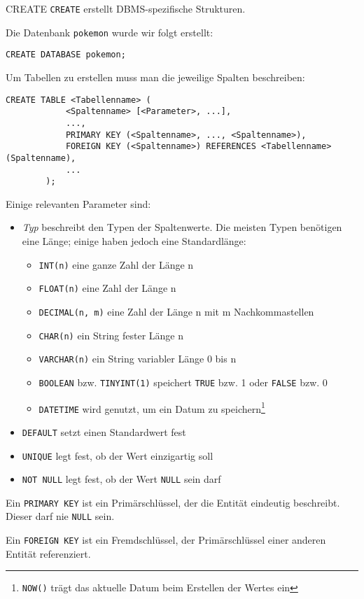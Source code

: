 \begin{sql}{CREATE}
    \texttt{CREATE} erstellt DBMS-spezifische Strukturen.

    Die Datenbank \texttt{pokemon} wurde wir folgt erstellt:

    \begin{lstlisting}[language=mysql]
        CREATE DATABASE pokemon;
    \end{lstlisting}

    Um Tabellen zu erstellen muss man die jeweilige Spalten beschreiben:

    \begin{lstlisting}[language=mysql]
        CREATE TABLE <Tabellenname> (
            <Spaltenname> [<Parameter>, ...],
            ...,
            PRIMARY KEY (<Spaltenname>, ..., <Spaltenname>),
            FOREIGN KEY (<Spaltenname>) REFERENCES <Tabellenname> (Spaltenname),
            ...
        );
    \end{lstlisting}

    Einige relevanten Parameter sind:

    \begin{itemize}
        \item \emph{Typ} beschreibt den Typen der Spaltenwerte.
            Die meisten Typen benötigen eine Länge; einige haben jedoch eine Standardlänge:
        
            \begin{itemize}
                \item \texttt{INT(n)} eine ganze Zahl der Länge n
                \item \texttt{FLOAT(n)} eine Zahl der Länge n
                \item \texttt{DECIMAL(n, m)} eine Zahl der Länge n mit m Nachkommastellen
                \item \texttt{CHAR(n)} ein String fester Länge n
                \item \texttt{VARCHAR(n)} ein String variabler Länge 0 bis n
                \item \texttt{BOOLEAN} bzw. \texttt{TINYINT(1)} speichert \texttt{TRUE} bzw. 1 oder \texttt{FALSE} bzw. 0
                \item \texttt{DATETIME} wird genutzt, um ein Datum zu speichern\footnote{\texttt{NOW()} trägt das aktuelle Datum beim Erstellen der Wertes ein}
            \end{itemize}
        \item \texttt{DEFAULT} setzt einen Standardwert fest
        \item \texttt{UNIQUE} legt fest, ob der Wert einzigartig soll
        \item \texttt{NOT NULL} legt fest, ob der Wert \texttt{NULL} sein darf
    \end{itemize}

    Ein \texttt{PRIMARY KEY} ist ein Primärschlüssel, der die Entität eindeutig beschreibt.
    Dieser darf nie \texttt{NULL} sein.

    Ein \texttt{FOREIGN KEY} ist ein Fremdschlüssel, der Primärschlüssel einer anderen Entität referenziert.
\end{sql}

